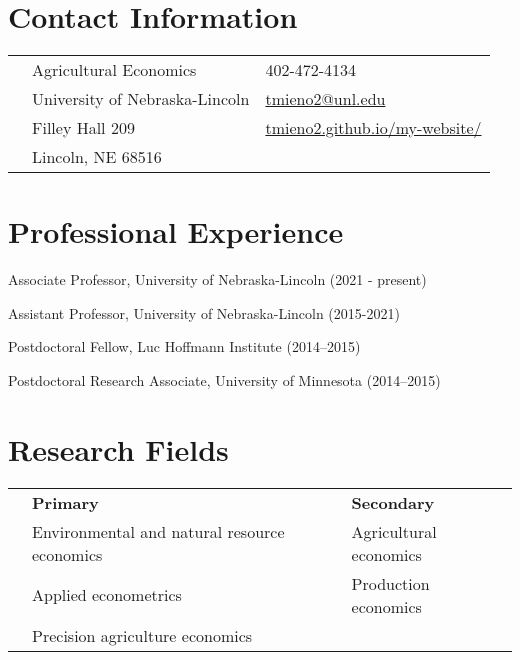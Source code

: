 \documentclass[10pt,margin,line]{res}
\newenvironment{list1}{
  \begin{list}{\ding{113}}{%
      \setlength{\itemsep}{0in}
      \setlength{\parsep}{0in} \setlength{\parskip}{0in}
      \setlength{\topsep}{0in} \setlength{\partopsep}{0in}
      \setlength{\leftmargin}{0.17in}}}{\end{list}}
\begin{document}

\begin{resume}
\thispagestyle{plain} %

\section{\sc Contact Information}
\vspace{.05in}
\begin{tabular}{@{}p{0.20in}p{2.75in}p{2.75in}}
 & Agricultural Economics             & 402-472-4134 \\
 & University of Nebraska-Lincoln  & \href{mailto: tmieno2@unl.edu}{tmieno2@unl.edu} \\
 & Filley Hall 209 & \href{https://tmieno2.github.io/my-website/}{tmieno2.github.io/my-website/}\\
 & Lincoln, NE 68516  & \\
\end{tabular}


\section{\sc Professional Experience}
\begin{list1}
\item[] Associate Professor, University of Nebraska-Lincoln (2021 - present)
\item[] Assistant Professor, University of Nebraska-Lincoln (2015-2021)
\item[] Postdoctoral Fellow, Luc Hoffmann Institute (2014--2015)
\item[] Postdoctoral Research Associate, University of Minnesota (2014--2015)
\end{list1}

\section{\sc Research Fields}
\vspace{.05in}
\begin{tabular}{@{}p{0.20in}p{3in}p{3in}}
& \textbf{Primary}     & \textbf{Secondary} \\
& Environmental and natural resource economics                             &  Agricultural economics \\
& Applied econometrics & Production economics \\
& Precision agriculture economics
\end{tabular}


\end{resume}
\end{document}
